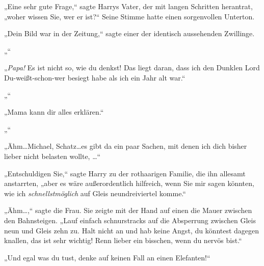 „Eine sehr gute Frage,“ sagte Harrys Vater, der mit langen Schritten herantrat, „woher wissen Sie, wer er ist?“ Seine Stimme hatte einen sorgenvollen Unterton.

„Dein Bild war in der Zeitung,“ sagte einer der identisch aussehenden Zwillinge.

„“

„\emph{Papa!} Es ist nicht so, wie du denkst! Das liegt daran, dass ich den Dunklen Lord Du-weißt-schon-wer besiegt habe als ich ein Jahr alt war.“

„“

„Mama kann dir alles erklären.“

„“

„Ähm…Michael, Schatz…es gibt da ein paar Sachen, mit denen ich dich bisher lieber nicht belasten wollte, …“

„Entschuldigen Sie,“ sagte Harry zu der rothaarigen Familie, die ihn allesamt anstarrten, „aber es wäre außerordentlich hilfreich, wenn Sie mir sagen könnten, wie ich \emph{schnellstmöglich} auf Gleis neundreiviertel komme.“

„Ähm…,“ sagte die Frau. Sie zeigte mit der Hand auf einen die Mauer zwischen den Bahnsteigen. „Lauf einfach schnurstracks auf die Absperrung zwischen Gleis neun und Gleis zehn zu. Halt nicht an und hab keine Angst, du könntest dagegen knallen, das ist sehr wichtig! Renn lieber ein bisschen, wenn du nervös bist.“

„Und egal was du tust, denke auf keinen Fall an einen Elefanten!“

